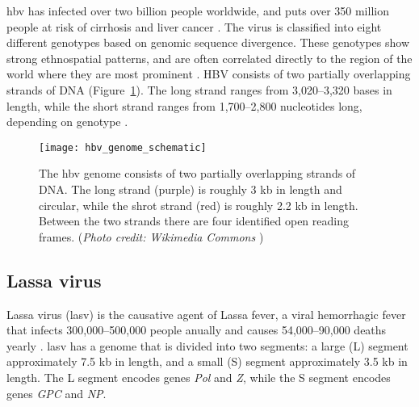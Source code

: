\gls{hbv} has infected over two billion people worldwide, and puts over 350 million people at risk of cirrhosis and liver cancer \cite{kane1995}.
The virus is classified into eight different genotypes based on genomic sequence divergence.
These genotypes show strong ethnospatial patterns, and are often correlated directly to the region of the world where they are most prominent \cite{schaefer2007}.
HBV consists of two partially overlapping strands of DNA (Figure~\ref{fig:hbvGenome}).
The long strand ranges from 3,020--3,320 bases in length, while the short strand ranges from 1,700--2,800 nucleotides long, depending on genotype \cite{kay2007_hepatitis_b_virus_genetic_variability}.

\begin{figure}[ht]
  \centering
  \medskip
  \texttt{[image: hbv\_genome\_schematic]}
  \caption[Scematic of the HBV genome]{The \gls{hbv} genome consists of two partially overlapping strands of DNA. The long strand (purple) is roughly 3 kb in length and circular, while the shrot strand (red) is roughly 2.2 kb in length. Between the two strands there are four identified open reading frames. (\textit{Photo credit: Wikimedia Commons} \cite{HBVwiki})}
  \label{fig:hbvGenome}
\end{figure}

\subsection{Lassa virus}

Lassa virus (\gls{lasv}) is the causative agent of Lassa fever, a viral hemorrhagic fever that infects 300,000--500,000 people anually and causes 54,000--90,000 deaths yearly \cite{three, lassa, papers}.
\gls{lasv} has a genome that is divided into two segments: a large (L) segment approximately 7.5 kb in length, and a small (S) segment approximately 3.5 kb in length.
The L segment encodes genes \textit{Pol} and \textit{Z}, while the S segment encodes genes \textit{GPC} and \textit{NP}.



\cleardoublepage


